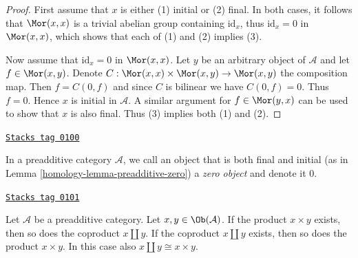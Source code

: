 \begin{proof}
First assume that $x$ is either (1) initial or (2) final.
In both cases, it follows that $\Mor(x,x)$ is a trivial abelian group
containing $\text{id}_x$, thus $\text{id}_x = 0$ in
$\Mor(x, x)$, which shows that each of (1) and (2) implies (3).

\medskip\noindent
Now assume that $\text{id}_x = 0$ in $\Mor(x,x)$. Let $y$
be an arbitrary object of $\mathcal{A}$ and let $f \in \Mor(x ,y)$.
Denote $C : \Mor(x,x) \times \Mor(x,y) \to \Mor(x,y)$ the composition map.
Then $f = C(0, f)$ and since $C$ is bilinear we have $C(0, f) = 0$.
Thus $f = 0$. Hence $x$ is initial in $\mathcal{A}$.
A similar argument for $f \in \Mor(y, x)$ can be used to show that
$x$ is also final. Thus (3) implies both (1) and (2).
\end{proof}

\begin{definition}
\label{homology-definition-zero-object}
\href{https://stacks.math.columbia.edu/tag/0100}{\texttt{Stacks tag 0100}}

In a preadditive category $\mathcal{A}$, we call an object that is both
final and initial (as in Lemma \ref{homology-lemma-preadditive-zero}) a
{\it zero object} and denote it $0$.
\end{definition}

\begin{lemma}
\label{homology-lemma-preadditive-direct-sum}
\href{https://stacks.math.columbia.edu/tag/0101}{\texttt{Stacks tag 0101}}

Let $\mathcal{A}$ be a preadditive category.
Let $x, y \in \Ob(\mathcal{A})$.
If the product $x \times y$ exists, then so does
the coproduct $x \amalg y$.
If the coproduct $x \amalg y$ exists, then so does
the product $x \times y$. In this case
also $x \amalg y \cong x \times y$.
\end{lemma}

